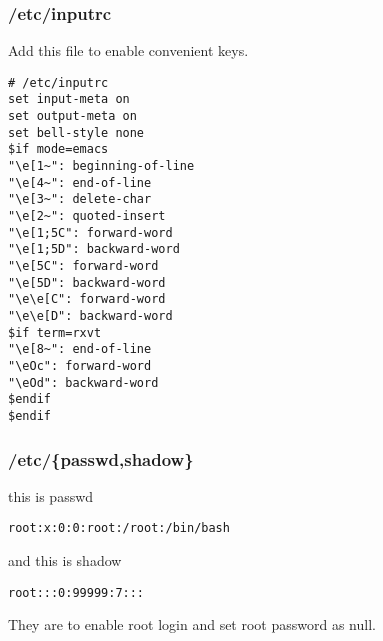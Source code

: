 \documentclass[10pt,a4paper]{article}
\begin{document}
\subsubsection{/etc/inputrc}
Add this file to enable convenient keys.
\begin{framed}\begin{verbatim}
# /etc/inputrc
set input-meta on
set output-meta on
set bell-style none
$if mode=emacs
"\e[1~": beginning-of-line
"\e[4~": end-of-line
"\e[3~": delete-char
"\e[2~": quoted-insert
"\e[1;5C": forward-word
"\e[1;5D": backward-word
"\e[5C": forward-word
"\e[5D": backward-word
"\e\e[C": forward-word
"\e\e[D": backward-word
$if term=rxvt
"\e[8~": end-of-line
"\eOc": forward-word
"\eOd": backward-word
$endif
$endif
\end{verbatim}\end{framed}

\subsubsection{/etc/\{passwd,shadow\}}
this is passwd
\begin{verbatim}
root:x:0:0:root:/root:/bin/bash
\end{verbatim}
and this is shadow
\begin{verbatim}
root:::0:99999:7:::
\end{verbatim}
They are to enable root login and set root password as null.
\end{document}

